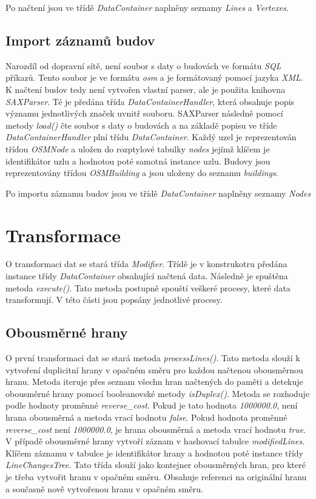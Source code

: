 Po načtení jsou ve třídě \textit{DataContainer} naplněny seznamy \textit{Lines} a \textit{Vertexes}.

\subsection{Import záznamů budov}

Narozdíl od dopravní sítě, není soubor s daty o budovách ve formátu \textit{SQL} příkazů. Tento soubor je ve formátu \textit{osm} a je formátovaný pomocí jazyka \textit{XML}. K načtení budov tedy není vytvořen vlastní parser, ale je použita knihovna \textit{SAXParser}. Té je předána třída \textit{DataContainerHandler}, která obsahuje popis významu jednotlivých značek uvnitř souboru. SAXParser následně pomocí metody \textit{load()} čte soubor s daty o budovách a na základě popisu ve tříde \textit{DataContainerHandler} plní třídu \textit{DataContainer}. Každý uzel je reprezentován třídou \textit{OSMNode} a uložen do rozptylové tabulky \textit{nodes} jejímž klíčem je identifikátor uzlu a hodnotou poté samotná instance uzlu. Budovy jsou reprezentovány třídou \textit{OSMBuilding} a jsou uloženy do seznamu \textit{buildings}.

Po importu záznamu budov jsou ve třídě \textit{DataContainer} naplněny seznamy \textit{Nodes}

\section{Transformace}

O transformaci dat se stará třída \textit{Modifier}. Třídě je v konstrukotru předána instance třídy \textit{DataContainer} obsahující načtená data. Následně je spuštěna metoda \textit{execute()}. Tato metoda postupně spouští veškeré procesy, které data transformují. V této části jsou popsány jednotlivé procesy.

\subsection{Obousměrné hrany}

O první transformaci dat se stará metoda \textit{processLines()}. Tato metoda slouží k vytvoření duplicitní hrany v opačném směru pro každou načtenou obousměrnou hranu. Metoda iteruje přes seznam všechn hran načtených do paměti a detekuje obousměrné hrany pomocí booleanovské metody \textit{isDuplex()}. Metoda se rozhoduje podle hodnoty proměnné \textit{reverse\_cost}. Pokud je tato hodnota \textit{1000000.0}, není hrana obousměrná a metoda vrací hodnotu \textit{false}. Pokud hodnota proměnné \textit{reverse\_cost} není \textit{1000000.0}, je hrana obousměrná a metoda vrací hodnotu \textit{true}. V případě obousměrné hrany vytvoří záznam v hashovací tabulce \textit{modifiedLines}. Klíčem záznamu v tabulce je identifikátor hrany a hodnotou poté instance třídy \textit{LineChangesTree}. Tato třída slouží jako kontejner obousměrných hran, pro které je třeba vytvořit hranu v opačném směru. Obsahuje referenci na originální hranu a současně nově vytvořenou hranu v opačném směru. 

